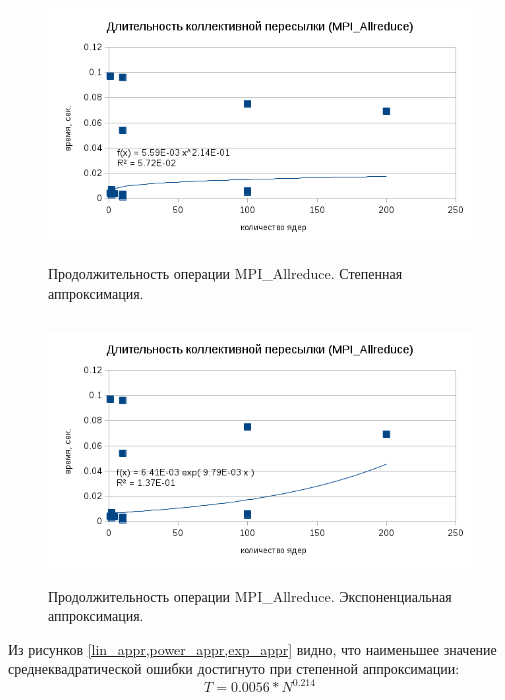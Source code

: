         \begin{figure}[htb]
        	\begin{center}
        		\includegraphics[height=7cm,keepaspectratio]{images/RomanenkoAASnytnikovAVChernykhIGadaptationtosupercomputerfinalEXTENDEDREFERENCES-img3.png}
        	\end{center}
        	\caption{Продолжительность операции MPI\_Allreduce. Степенная аппроксимация.}
        	\label{power_appr}
        \end{figure}
        
       
       
       \begin{figure}[htb]
       	\begin{center}
       		\includegraphics[height=7cm,keepaspectratio]{images/RomanenkoAASnytnikovAVChernykhIGadaptationtosupercomputerfinalEXTENDEDREFERENCES-img4.png}
       	\end{center}
       	\caption{Продолжительность операции MPI\_Allreduce. Экспоненциальная аппроксимация.}
       	\label{exp_appr}
       \end{figure} 
        Из рисунков \ref{lin_appr,power_appr,exp_appr} видно, что наименьшее значение среднеквадратической ошибки достигнуто при степенной аппроксимации:
        $$
        T = 0.0056*N^{0.214}
        $$
        \clearpage
        
